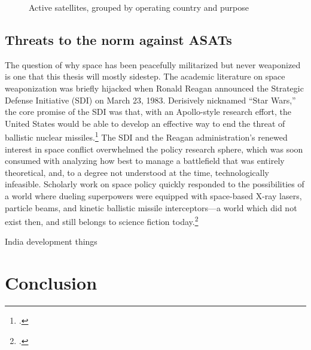 \documentclass{report}
\begin{document}
\begin{figure}[ht]
  \centering
  
  \label{country_sats}
  \caption{Active satellites, grouped by operating country and purpose}
\end{figure}


\subsection{Threats to the norm against ASATs}
The question of why space has been peacefully militarized but never weaponized is one that this thesis will mostly sidestep. The academic literature on space weaponization was briefly hijacked when Ronald Reagan announced the Strategic Defense Initiative (SDI) on March 23, 1983. Derisively nicknamed ``Star Wars,'' the core promise of the SDI was that, with an Apollo-style research effort, the United States would be able to develop an effective way to end the threat of ballistic nuclear missiles.\footcite{reagan_address_1983} The SDI and the Reagan administration's renewed interest in space conflict overwhelmed the policy research sphere, which was soon consumed with analyzing how best to manage a battlefield that was entirely theoretical, and, to a degree not understood at the time, technologically infeasible. Scholarly work on space policy quickly responded to the possibilities of a world where dueling superpowers were equipped with space-based X-ray lasers, particle beams, and kinetic ballistic missile interceptors---a world which did not exist then, and still belongs to science fiction today.\footcite[p.~1-2]{moorhead_work_2013}


India development things

\section{Conclusion}
\newpage
\printbibliography[heading=subbibliography]
\end{document}
